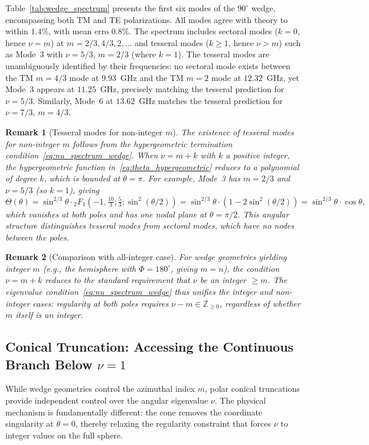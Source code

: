\documentclass[
  aip,
  amsmath,amssymb,
  preprint
]{revtex4-1}
\newtheorem{remark}{Remark}[section]
\begin{document}
Table~\ref{tab:wedge_spectrum} presents the first six modes of the $90^\circ$ wedge, encompassing both TM and TE polarizations. All modes agree with theory to within $1.4\%$, with mean erro $0.8\%$. The spectrum includes sectoral modes ($k = 0$, hence $\nu = m$) at $m = 2/3, 4/3, 2, \ldots$ and tesseral modes ($k \geq 1$, hence $\nu > m$) such as Mode~3 with $\nu = 5/3$, $m = 2/3$ (where $k = 1$). The tesseral modes are unambiguously identified by their frequencies: no sectoral mode exists between the TM $m = 4/3$ mode at $9.93$~GHz and the TM $m = 2$ mode at $12.32$~GHz, yet Mode~3 appears at $11.25$~GHz, precisely matching the tesseral prediction for $\nu = 5/3$. Similarly, Mode~6 at $13.62$~GHz matches the tesseral prediction for $\nu = 7/3$, $m = 4/3$.

\begin{remark}[Tesseral modes for non-integer $m$]
The existence of tesseral modes for non-integer $m$ follows from the hypergeometric termination condition~\eqref{eq:nu_spectrum_wedge}. When $\nu = m + k$ with $k$ a positive integer, the hypergeometric function in~\eqref{eq:theta_hypergeometric} reduces to a polynomial of degree $k$, which is bounded at $\theta = \pi$. For example, Mode~3 has $m = 2/3$ and $\nu = 5/3$ (so $k = 1$), giving
\begin{equation}
\Theta(\theta) = \sin^{2/3}\theta \cdot {}_2F_1\left(-1, \tfrac{10}{3}; \tfrac{5}{3}; \sin^2(\theta/2)\right) = \sin^{2/3}\theta \cdot (1 - 2\sin^2(\theta/2)) = \sin^{2/3}\theta \cdot \cos\theta,
\end{equation}
which vanishes at both poles and has one nodal plane at $\theta = \pi/2$. This angular structure distinguishes tesseral modes from sectoral modes, which have no nodes between the poles.
\end{remark}

\begin{remark}[Comparison with all-integer case]
For wedge geometries yielding integer $m$ (e.g., the hemisphere with $\Phi = 180^\circ$, giving $m = n$), the condition $\nu = m + k$ reduces to the standard requirement that $\nu$ be an integer $\geq m$. The eigenvalue condition~\eqref{eq:nu_spectrum_wedge} thus unifies the integer and non-integer cases: regularity at both poles requires $\nu - m \in \mathbb{Z}_{\geq 0}$, regardless of whether $m$ itself is an integer.
\end{remark}
\subsection{Conical Truncation: Accessing the Continuous Branch Below $\nu = 1$}
\label{subsec:cone_validation}
While wedge geometries control the azimuthal index $m$, polar conical truncations provide independent control over the angular eigenvalue $\nu$. The physical mechanism is fundamentally different: the cone removes the coordinate singularity at $\theta = 0$, thereby relaxing the regularity constraint that forces $\nu$ to integer values on the full sphere.
\end{document}

